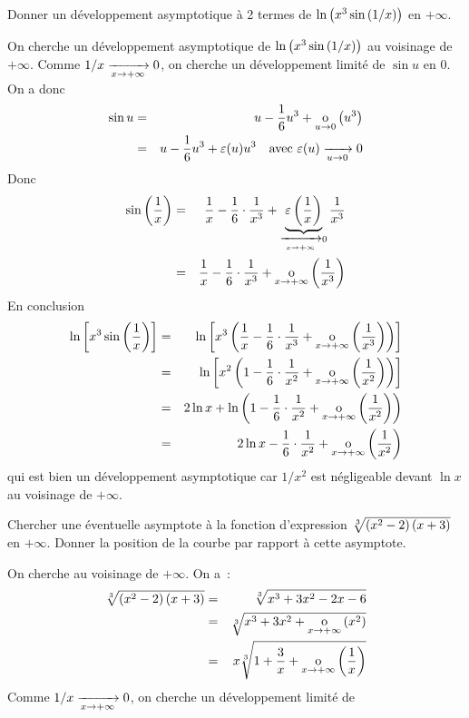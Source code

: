 \documentclass{magnoliaold}
\begin{document}
\begin{exos}
\exo Donner un développement asymptotique à 2 termes de $\ln\left(x^3\sin\left(1/x\right)\right)$ en $+\infty$.
  \begin{sol}
  On cherche un développement asymptotique de $\ln\left(x^3\sin\left(1/x\right)\right)$
  au voisinage de $+\infty$. Comme $1/x\xrightarrow[x\rightarrow +\infty]{}0$, on
  cherche un développement limité de $\sin u$ en 0. On a donc
  \begin{eqnarray*}
  \sin u
  &=& u-\frac{1}{6}u^3+\underset{u \rightarrow 0}{\text{o}}\left(u^3\right)\\
  &=& u-\frac{1}{6}u^3+\varepsilon(u)u^3
      \quad \text{avec $\varepsilon(u)\xrightarrow[u\rightarrow 0]{}0$}
  \end{eqnarray*}
  Donc
  \begin{eqnarray*}
  \sin\left(\frac{1}{x}\right)
  &=& \frac{1}{x}-\frac{1}{6}\cdot\frac{1}{x^3}+
      \underbrace{\varepsilon\left(\frac{1}{x}\right)}_{\xrightarrow[x\rightarrow +\infty]{}0}\frac{1}{x^3}\\
  &=& \frac{1}{x}-\frac{1}{6}\cdot\frac{1}{x^3}+\underset{x \rightarrow +\infty}{\text{o}}\left(\frac{1}{x^3}\right)
  \end{eqnarray*}
  En conclusion
  \begin{eqnarray*}
  \ln\cro{x^3\sin\p{\frac{1}{x}}}
  &=& \ln\cro{x^3\p{\frac{1}{x}-\frac{1}{6}\cdot\frac{1}{x^3}+%
      \petitoinfty{x}{\frac{1}{x^3}}}}\\
  &=& \ln\cro{x^2\p{1-\frac{1}{6}\cdot\frac{1}{x^2}+%
      \petitoinfty{x}{\frac{1}{x^2}}}}\\
  &=& 2\ln x+\ln\p{1-\frac{1}{6}\cdot\frac{1}{x^2}+%
      \petitoinfty{x}{\frac{1}{x^2}}}\\
  &=& 2\ln x-\frac{1}{6}\cdot\frac{1}{x^2}+\petitoinfty{x}{\frac{1}{x^2}}
  \end{eqnarray*}
  qui est bien un développement asymptotique car $1/x^2$ est négligeable devant
  $\ln x$ au voisinage de $+\infty$.    
  \end{sol}
\exo Chercher une éventuelle asymptote à la fonction d'expression
  $\sqrt[3]{\left(x^2-2\right)\left(x+3\right)}$ en $+\infty$. Donner la position de la courbe par
  rapport à cette asymptote.
  \begin{sol}
  On cherche 
  au voisinage de $+\infty$. On a~:
  \begin{eqnarray*}
  \sqrt[3]{\left(x^2-2\right)\left(x+3\right)}
  &=& \sqrt[3]{x^3+3x^2-2x-6}\\
  &=& \sqrt[3]{x^3+3x^2+\underset{x \rightarrow +\infty}{\text{o}}\left(x^2\right)}\\
  &=& x\sqrt[3]{1+\frac{3}{x}+\underset{x \rightarrow +\infty}{\text{o}}\left(\frac{1}{x}\right)}
  \end{eqnarray*}
  Comme $1/x\xrightarrow[x\rightarrow +\infty]{}0$, on cherche un développement limité de

\end{sol}
\end{exos}
\end{document}
